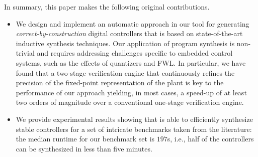 \documentclass[final]{sig-alternate-05-2015}
\begin{document}
In summary, this paper makes the following original contributions.
%
\begin{itemize}

\item We design and implement an automatic approach in our tool \tool  
  for generating {\em correct-by-construction} digital controllers that is
  based on state-of-the-art inductive synthesis techniques.  Our application
  of program synthesis is non-trivial and requires addressing challenges
  specific to embedded control systems, such as the effects of quantizers
  and FWL.  In particular, we have found that a two-stage verification
  engine that continuously refines the precision of the fixed-point
  representation of the plant is key to the performance of our approach
  yielding, in most cases, a speed-up of at least two orders of magnitude
  over a conventional one-stage verification engine.

\item We provide experimental results showing that \tool is able to
  efficiently synthesize stable controllers for a set of intricate
  benchmarks taken from the literature: the median runtime for our benchmark
  set is $197$s, i.e., half of the controllers can be synthesized in less
  than five minutes.



\end{itemize}


\end{document}
